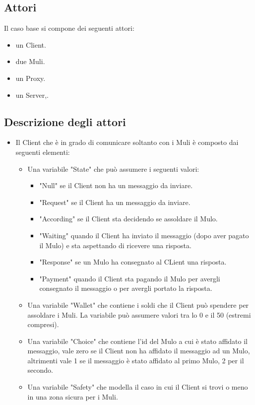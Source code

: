 \documentclass[13pt,a4paper]{article}
\begin{document}
\subsection{Attori}
Il caso base si compone dei seguenti attori: 
\begin{itemize}
	\item un Client.
	\item due Muli.
	\item un Proxy.
	\item un Server,.
\end{itemize}

\subsection{Descrizione degli attori}
\begin{itemize}
	\item Il Client che è in grado di comunicare soltanto con i Muli è composto dai seguenti elementi:
	\begin{itemize}
		\item Una variabile "State" che può assumere i seguenti valori:
		\begin{itemize}
			\item "Null" se il Client non ha un messaggio da inviare.
			\item "Request" se il Client ha un messaggio da inviare.
			\item "According" se il Client sta decidendo se assoldare il Mulo.
			\item "Waiting"  quando il Client ha inviato il messaggio (dopo aver pagato il Mulo) e sta aspettando di ricevere una risposta.
			\item "Response" se un Mulo ha consegnato al CLient una risposta.
			\item "Payment" quando il Client sta pagando il Mulo per avergli consegnato il messaggio o  per avergli portato la risposta.
		\end{itemize}
		\item Una variabile "Wallet" che contiene i soldi che il Client può spendere per assoldare i Muli. La variabile può assumere valori tra lo 0 e il 50 (estremi compresi).
		\item Una variabile "Choice" che contiene l'id del Mulo a cui è stato affidato il messaggio, vale zero se il Client non ha  affidato il messaggio ad un Mulo, altrimenti vale 1 se il messaggio è stato affidato al primo Mulo, 2 per il secondo.
		\item Una variabile "Safety" che modella il caso in cui il Client si trovi o meno in una zona sicura per i Muli.

\end{itemize}
\end{itemize}
\end{document}
